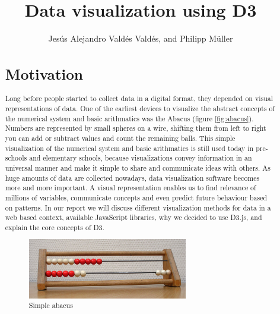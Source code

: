 \documentclass{bioinfo}
\begin{document}

\title[short Title]{Data visualization using D3}
\author[Data visualization using D3]{Jes\'us Alejandro Vald\'es Vald\'es, and Philipp M\"uller}
\address{}
\history{}
\editor{}

\maketitle

\begin{abstract}
\section{Motivation}
\newline
Long before people started to collect data in a digital format, they depended on visual representations of data.
One of the earliest devices to visualize the abstract concepts of the numerical system and basic arithmatics was the Abacus (figure \ref{fig:abacus}). %
Numbers are represented by small spheres on a wire, shifting them from left to right you can add or subtract values and count the remaining balls.
This simple visualization of the numerical system and basic arithmatics is still used today in pre-schools and elementary schools, because visualizations convey information in an universal manner and make it simple to share and communicate ideas with others.
\newline
As huge amounts of data are collected nowadays, data visualization software becomes more and more important. A visual representation enables us to find relevance of millions of variables, communicate concepts and even predict future behaviour based on patterns.
\newline
In our report we will discuss different visualization methods for data in a web based context, available JavaScript libraries, why we decided to use D3.js, and explain the core concepts of D3.

\begin{figure}[!tpb]
\centerline{\includegraphics[width=70mm]{abacus.jpg}}
\caption{Simple abacus}\label{fig:abacus}
\end{figure}


\end{abstract}
\end{document}
